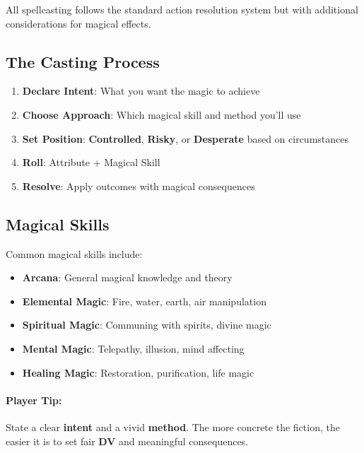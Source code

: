 \begin{multicols}{2}
All spellcasting follows the standard action resolution system but with additional considerations for magical effects.

\subsection*{The Casting Process}
\begin{enumerate}
\item \textbf{Declare Intent}: What you want the magic to achieve
\item \textbf{Choose Approach}: Which magical skill and method you'll use
\item \textbf{Set Position}: \textbf{Controlled}, \textbf{Risky}, or \textbf{Desperate} based on circumstances
\item \textbf{Roll}: Attribute + Magical Skill
\item \textbf{Resolve}: Apply outcomes with magical consequences
\end{enumerate}

\subsection*{Magical Skills}
Common magical skills include:
\begin{itemize}
\item \textbf{Arcana}: General magical knowledge and theory
\item \textbf{Elemental Magic}: Fire, water, earth, air manipulation
\item \textbf{Spiritual Magic}: Communing with spirits, divine magic
\item \textbf{Mental Magic}: Telepathy, illusion, mind affecting
\item \textbf{Healing Magic}: Restoration, purification, life magic
\end{itemize}

\paragraph{Player Tip:}
State a clear \textbf{intent} and a vivid \textbf{method}. The more concrete the fiction, the easier it is to set fair \textbf{DV} and meaningful consequences.


\end{multicols}
